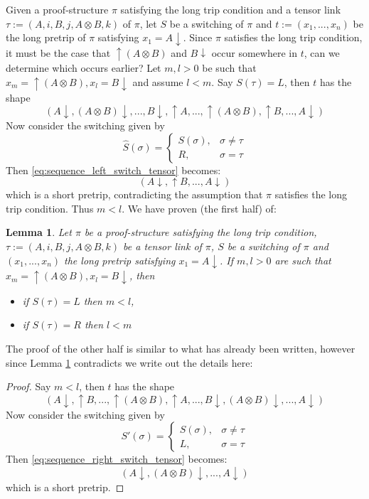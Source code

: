 \documentclass[12pt]{article}
\theoremstyle{plain}
\newtheorem{lemma}[thm]{Lemma}
\theoremstyle{definition}
\begin{document}
Given a proof-structure $\pi$ satisfying the long trip condition and a tensor link $\tau := (A,i,B,j, A \otimes B,k)$ of $\pi$, let $S$ be a switching of $\pi$ and $t := (x_1,...,x_n)$ be the long pretrip of $\pi$ satisfying $x_1 =A\downarrow$. Since $\pi$ satisfies the long trip condition, it must be the case that $\uparrow (A \otimes B)$ and $B\downarrow$ occur somewhere in $t$, can we determine which occurs earlier? Let $m,l > 0$ be such that $x_m = \uparrow (A \otimes B), x_l = B\downarrow$ and assume $l < m$. Say $S(\tau) = L$, then $t$ has the shape
\begin{equation}\label{eq:sequence_left_switch_tensor}
    (A\downarrow, (A \otimes B)\downarrow, ..., B \downarrow, \uparrow A, ..., \uparrow (A \otimes B), \uparrow B, ..., A\downarrow)
\end{equation}
Now consider the switching given by
\[\hat{S}(\sigma) = \begin{cases}
S(\sigma),& \sigma \neq \tau\\
R, & \sigma = \tau
\end{cases}
\]
Then \eqref{eq:sequence_left_switch_tensor} becomes:
\begin{equation}
    (A\downarrow, \uparrow B, ..., A\downarrow)
\end{equation}
which is a short pretrip, contradicting the assumption that $\pi$ satisfies the long trip condition. Thus $m < l$. We have proven (the first half) of:
\begin{lemma}\label{lem:stays_contained_tensor}
Let $\pi$ be a proof-structure satisfying the long trip condition, $\tau := (A,i,B,j, A \otimes B,k)$ be a tensor link of $\pi$, $S$ be a switching of $\pi$ and $(x_1,...,x_n)$ the long pretrip satisfying $x_1 = A \downarrow$. If $m,l > 0$ are such that $x_m = \uparrow (A \otimes B), x_l = B \downarrow$, then
\begin{itemize}
    \item if $S(\tau) = L$ then $m < l$,
    \item if $S(\tau) = R$ then $l < m$
\end{itemize}
\end{lemma}
The proof of the other half is similar to what has already been written, however since Lemma \ref{lem:stays_contained_tensor} contradicts \cite[Lemma 2.9.1]{linearlogic} we write out the details here:
\begin{proof}
Say $m < l$, then $t$ has the shape
\begin{equation}\label{eq:sequence_right_switch_tensor}
(A\downarrow, \uparrow B, ..., \uparrow (A \otimes B), \uparrow A, ..., B \downarrow, (A \otimes B)\downarrow, ..., A\downarrow)
\end{equation}
Now consider the switching given by
\[
S'(\sigma) = 
\begin{cases}
S(\sigma),& \sigma \neq \tau\\
L, & \sigma = \tau
\end{cases}
\]
Then \eqref{eq:sequence_right_switch_tensor} becomes:
\begin{equation}
    (A\downarrow, (A \otimes B)\downarrow,..., A\downarrow)
\end{equation}
which is a short pretrip.
\end{proof}
\end{document}
